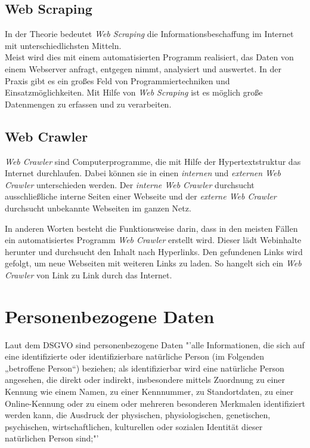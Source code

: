 	\subsection{Web Scraping}
		In der Theorie bedeutet \textit{Web Scraping} die Informationsbeschaffung im Internet mit unterschiedlichsten Mitteln. \cite{WebScraping}\\		
		Meist wird dies mit einem automatisierten Programm realisiert, das Daten von einem Webserver anfragt, entgegen nimmt, analysiert und auswertet. 
		In der Praxis gibt es ein großes Feld von Programmiertechniken und Einsatzmöglichkeiten.
		Mit Hilfe von \textit{Web Scraping} ist es möglich große Datenmengen zu erfassen und zu verarbeiten.\cite{WebScraping}

	\subsection{Web Crawler}
	\textit{Web Crawler} sind Computerprogramme, die mit Hilfe der Hypertextstruktur das Internet durchlaufen. Dabei können sie in einen \textit{internen} und \textit{externen Web Crawler} unterschieden werden. Der \textit{interne Web Crawler} durchsucht ausschließliche interne Seiten einer Webseite und der \textit{externe Web Crawler} durchsucht unbekannte Webseiten im ganzen Netz. \cite{sharma2012study}
	
	In anderen Worten besteht die Funktionsweise darin, dass in den meisten Fällen ein automatisiertes Programm \textit{Web Crawler} erstellt wird. Dieser lädt Webinhalte herunter und durchsucht den Inhalt nach Hyperlinks. Den gefundenen Links wird gefolgt, um neue Webseiten mit weiteren Links zu laden. So hangelt sich ein \textit{Web Crawler} von Link zu Link durch das Internet.\cite{WebScraping}


\section{Personenbezogene Daten}
	Laut dem DSGVO sind personenbezogene Daten "'alle Informationen, die sich auf eine identifizierte oder identifizierbare natürliche Person (im Folgenden „betroffene Person“) beziehen; als identifizierbar wird eine natürliche Person angesehen, die direkt oder indirekt, insbesondere mittels Zuordnung zu einer Kennung wie einem Namen, zu einer Kennnummer, zu Standortdaten, zu einer Online-Kennung oder zu einem oder mehreren besonderen Merkmalen identifiziert werden kann, die Ausdruck der physischen, physiologischen, genetischen, psychischen, wirtschaftlichen, kulturellen oder sozialen Identität dieser natürlichen Person sind;"'\cite{personenbezogeneDaten}
